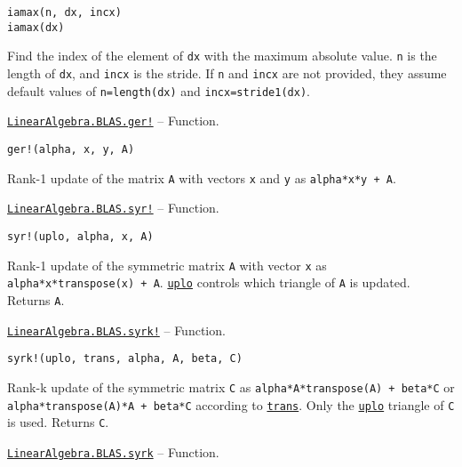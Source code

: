 \begin{adjustwidth}{2em}{0pt}


\begin{verbatim}
iamax(n, dx, incx)
iamax(dx)
\end{verbatim}

Find the index of the element of \texttt{dx} with the maximum absolute value. \texttt{n} is the length of \texttt{dx}, and \texttt{incx} is the stride. If \texttt{n} and \texttt{incx} are not provided, they assume default values of \texttt{n=length(dx)} and \texttt{incx=stride1(dx)}.



\end{adjustwidth}
\hypertarget{15218685048281144798}{}
\hyperlink{15218685048281144798}{\texttt{LinearAlgebra.BLAS.ger!}}  -- {Function.}

\begin{adjustwidth}{2em}{0pt}


\begin{verbatim}
ger!(alpha, x, y, A)
\end{verbatim}

Rank-1 update of the matrix \texttt{A} with vectors \texttt{x} and \texttt{y} as \texttt{alpha*x*y{\textquotesingle} + A}.



\end{adjustwidth}
\hypertarget{12739496223053575792}{}
\hyperlink{12739496223053575792}{\texttt{LinearAlgebra.BLAS.syr!}}  -- {Function.}

\begin{adjustwidth}{2em}{0pt}


\begin{verbatim}
syr!(uplo, alpha, x, A)
\end{verbatim}

Rank-1 update of the symmetric matrix \texttt{A} with vector \texttt{x} as \texttt{alpha*x*transpose(x) + A}. \hyperlink{13880289478825450693}{\texttt{uplo}} controls which triangle of \texttt{A} is updated. Returns \texttt{A}.



\end{adjustwidth}
\hypertarget{17626560315865992019}{}
\hyperlink{17626560315865992019}{\texttt{LinearAlgebra.BLAS.syrk!}}  -- {Function.}

\begin{adjustwidth}{2em}{0pt}


\begin{verbatim}
syrk!(uplo, trans, alpha, A, beta, C)
\end{verbatim}

Rank-k update of the symmetric matrix \texttt{C} as \texttt{alpha*A*transpose(A) + beta*C} or \texttt{alpha*transpose(A)*A + beta*C} according to \hyperlink{15951037910221396131}{\texttt{trans}}. Only the \hyperlink{13880289478825450693}{\texttt{uplo}} triangle of \texttt{C} is used. Returns \texttt{C}.



\end{adjustwidth}
\hypertarget{13051593926705442778}{}
\hyperlink{13051593926705442778}{\texttt{LinearAlgebra.BLAS.syrk}}  -- {Function.}

